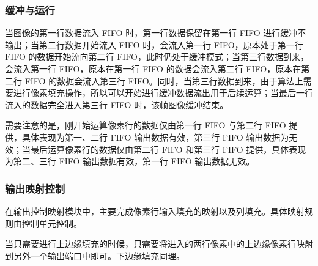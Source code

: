 \documentclass[12pt, a4paper, oneside]{ctexbook}
\begin{document}
	\subsubsection{缓冲与运行}
	当图像的第一行数据流入 FIFO 时，第一行数据保留在第一行 FIFO 进行缓冲不输出；当第二行数据开始流入 FIFO 时，会流入第一行 FIFO，原本处于第一行 FIFO 的数据开始流向第二行 FIFO，此时仍处于缓冲模式；当第三行数据到来，会流入第一行 FIFO，原本在第一行 FIFO 的数据会流入第二行 FIFO，原本在第二行 FIFO 的数据会流入第三行 FIFO。同时，当第三行数据到来，由于算法上需要进行像素填充操作，所以可以开始进行缓冲数据流出用于后续运算；当最后一行流入的数据完全进入第三行 FIFO 时，该帧图像缓冲结束。
	\par 需要注意的是，刚开始运算像素行的数据仅由第一行 FIFO 与第二行 FIFO 提供，具体表现为第一、二行 FIFO 输出数据有效，第三行 FIFO 输出数据为无效；当最后运算像素行的数据仅由第二行 FIFO 和第三行 FIFO 提供，具体表现为第二、三行 FIFO 输出数据有效，第一行 FIFO 输出数据无效。
	\subsubsection{输出映射控制}
	在输出控制映射模块中，主要完成像素行输入填充的映射以及列填充。具体映射规则由控制单元控制。\par 当只需要进行上边缘填充的时候，只需要将进入的两行像素中的上边缘像素行映射到另外一个输出端口中即可。下边缘填充同理。
	
	
	

	
	
\end{document}
